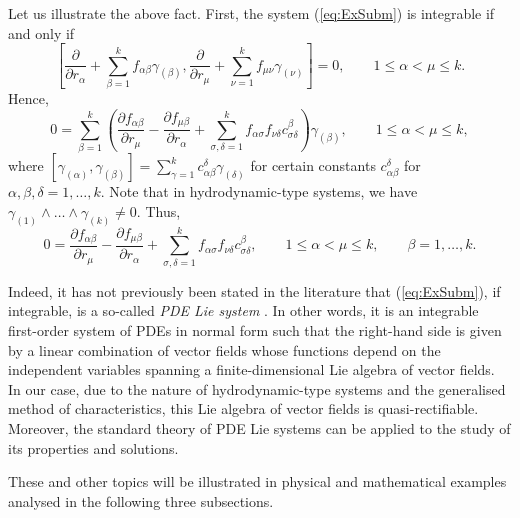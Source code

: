 \documentclass[12pt]{article}
\theoremstyle{plain}
\theoremstyle{definition}
\numberwithin{equation}{section}
\begin{document}
Let us illustrate the above fact. First, the system (\ref{eq:ExSubm}) is integrable if and only if 
\begin{equation}\label{eq:IntCon}
\left[\frac{\partial}{\partial r_\alpha}+\sum_{\beta=1}^kf_{\alpha\beta}\gamma_{(\beta)},\frac{\partial}{\partial r_\mu}+\sum_{\nu=1}^kf_{\mu\nu}\gamma_{(\nu)}\right]=0,\qquad 1\leq \alpha<\mu\leq k.
\end{equation}
Hence, 
$$
0=\sum_{\beta=1}^k\left(\frac{\partial f_{\alpha\beta}}{\partial r_\mu}-\frac{\partial f_{\mu\beta}}{\partial r_\alpha}+\sum_{\sigma,\delta=1}^kf_{\alpha \sigma}f_{\nu \delta}c_{\sigma\delta}^\beta \right)\gamma_{(\beta)},\qquad 1\leq \alpha<\mu\leq k,
$$
where $[\gamma_{(\alpha)},\gamma_{(\beta)}]=\sum_{\gamma=1}^kc_{\alpha\beta}^\delta\gamma_{(\delta)}$ for certain constants $c_{\alpha\beta}^\delta$ for $\alpha,\beta,\delta=1,\ldots,k$. Note that in hydrodynamic-type systems, we have $\gamma_{(1)}\wedge\ldots\wedge\gamma_{(k)}\neq 0$. 
Thus, 
$$
0=\frac{\partial f_{\alpha\beta}}{\partial r_\mu} -\frac{\partial f_{\mu\beta}}{\partial r_\alpha} +\sum_{\sigma,\delta=1}^kf_{\alpha \sigma}f_{\nu \delta}c_{\sigma\delta}^\beta,\qquad 1\leq \alpha<\mu\leq k,\qquad \beta=1,\ldots,k.
$$

Indeed, it has not previously been stated in the literature that (\ref{eq:ExSubm}), if integrable, is a so-called {\it PDE Lie system} \cite{CGM07,CL11}. In other words, it is an integrable  first-order system of PDEs in normal form such that the right-hand side is given by a linear combination of vector fields whose functions depend on the independent variables  spanning a finite-dimensional Lie algebra of vector fields. In our case,  due to the nature of hydrodynamic-type systems and the generalised method of characteristics, this Lie algebra of vector fields is quasi-rectifiable. Moreover, the standard theory of PDE Lie systems \cite{Ra11} can be applied to the study of its properties and solutions.

These and other topics will be illustrated in physical and mathematical examples analysed in the following three subsections.
\end{document}
